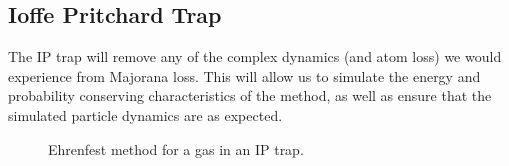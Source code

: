 
\subsection{Ioffe Pritchard Trap}

The IP trap will remove any of the complex dynamics (and atom loss) we would experience from Majorana loss.
This will allow us to simulate the energy and probability conserving characteristics of the method, as well as ensure that the simulated particle dynamics are as expected.

\begin{figure}
\hspace{-11em}
\caption{Ehrenfest method for a gas in an IP trap.}\label{fig:ehrenfestIP}
\end{figure}

